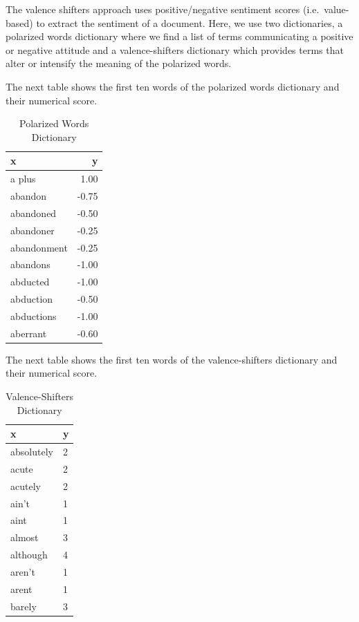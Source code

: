 \documentclass[
]{article}
\begin{document}
The valence shifters approach uses positive/negative sentiment scores
(i.e.~value-based) to extract the sentiment of a document. Here, we use
two dictionaries, a polarized words dictionary where we find a list of
terms communicating a positive or negative attitude and a
valence-shifters dictionary which provides terms that alter or intensify
the meaning of the polarized words.

The next table shows the first ten words of the polarized words
dictionary and their numerical score.

\begin{table}

\caption{\label{tab:polarized words dictionary}Polarized Words Dictionary}
\centering
\begin{tabular}[t]{l|r}
\hline
x & y\\
\hline
a plus & 1.00\\
\hline
abandon & -0.75\\
\hline
abandoned & -0.50\\
\hline
abandoner & -0.25\\
\hline
abandonment & -0.25\\
\hline
abandons & -1.00\\
\hline
abducted & -1.00\\
\hline
abduction & -0.50\\
\hline
abductions & -1.00\\
\hline
aberrant & -0.60\\
\hline
\end{tabular}
\end{table}

The next table shows the first ten words of the valence-shifters
dictionary and their numerical score.

\begin{table}

\caption{\label{tab:valence-shifters dictionary}Valence-Shifters Dictionary}
\centering
\begin{tabular}[t]{l|l}
\hline
x & y\\
\hline
absolutely & 2\\
\hline
acute & 2\\
\hline
acutely & 2\\
\hline
ain't & 1\\
\hline
aint & 1\\
\hline
almost & 3\\
\hline
although & 4\\
\hline
aren't & 1\\
\hline
arent & 1\\
\hline
barely & 3\\
\hline
\end{tabular}
\end{table}
\end{document}
